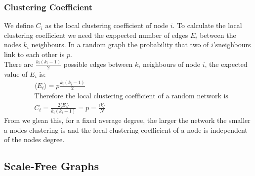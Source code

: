 \documentclass{article}
\begin{document}
            \subsubsection{Clustering Coefficient}
            We define $C_i$ as the local clustering coefficient of node $i$. To calculate the local clustering coefficient we need the exppected number of edges $E_i$ between the nodes $k_i$ neighbours. In a random graph the probability that two of $i$'sneighbours link to each other is $p$.\\ There are $\frac{k_{i}(k_{i}-1)}{2}$ possible edges between $k_i$ neighbours of node $i$, the expected value of $E_i$ is:
            \begin{align*}
                &\langle E_i \rangle = p\frac{k_{i}(k_{i}-1)}{2}\\
                &\text{Therefore the local clustering coefficient of a random network is}\\
                &C_i = \frac{2\langle E_i \rangle}{k_{i}(k_{i}-1)} = p = \frac{\langle k \rangle}{N}
            \end{align*} 
            From we glean this, for a fixed average degree, the larger the network the smaller a nodes clustering is and the local clustering coefficient of a node is independent of the nodes degree.
        \subsection{Scale-Free Graphs}
\end{document}
